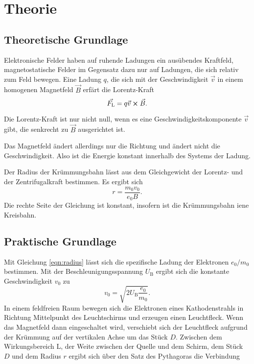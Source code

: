 \section{Theorie}
\label{sec:Theorie}

\subsection{Theoretische Grundlage}
Elektronische Felder haben auf ruhende Ladungen ein ausübendes Kraftfeld, magnetostatische Felder im Gegensatz dazu nur auf Ladungen, die sich relativ zum Feld bewegen. 
Eine Ladung $q$, die sich mit der Geschwindigkeit $\vec{v}$ in einem homogenen Magnetfeld $\vec{B}$ erfärt die Lorentz-Kraft 
\begin{equation}
    \vec{F_\text{L}}= q \vec{v} \cross \vec{B}.
    \label{eqn:Lorentz}
\end{equation}

Die Lorentz-Kraft ist nur nicht null, wenn es eine Geschwindigkeitskomponente $\vec{v}$ gibt, die senkrecht zu $\vec{B}$ ausgerichtet ist. 

Das  Magnetfeld ändert allerdings nur die Richtung und ändert nicht die Geschwindigkeit. Also ist die Energie konstant innerhalb des Systems der Ladung. 

Der Radius der Krümmungsbahn lässt aus dem Gleichgewicht der Lorentz- und der Zentrifugalkraft bestimmen. Es ergibt sich 
\begin{equation}
    r= \frac{m_\text{0}v_\text{0}}{e_\text{0} B}.
    \label{eqn:radius}
\end{equation}
Die rechte Seite der Gleichung ist konstant, insofern ist die Krümmungsbahn iene Kreisbahn. 

\subsection{Praktische Grundlage}

Mit Gleichung \ref{eqn:radius} lässt sich die spezifische Ladung der Elektronen $e_\text{0}/m_\text{0}$ bestimmen. 
Mit der Beschleunigungsspannung $U_\text{B}$ ergibt sich die konstante Geschwindigkeit $v_\text{0}$ zu 
\begin{equation}
    v_\text{0}= \sqrt{2 U_\text{B} \frac{e_\text{0}}{m_\text{0}}}.
    \label{eqn:v0}
\end{equation}
In einem feldfreien Raum bewegen sich die Elektronen eines Kathodenstrahls in Richtung Mittelpunkt des Leuchtschirms und erzeugen einen Leuchtfleck. 
Wenn das Magnetfeld dann eingeschaltet wird, verschiebt sich der Leuchtfleck aufgrund der Krümmung auf der vertikalen Achse um das Stück $D$. Zwischen dem Wirkungsbereich L, der Weite zwischen der Quelle und dem Schirm, dem Stück $D$ und dem Radius $r$ ergibt sich über den Satz des Pythagoras die Verbindung

